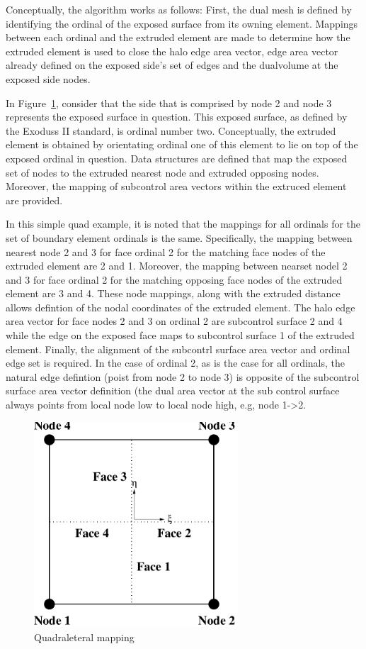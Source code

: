 Conceptually, the algorithm works as follows: First, the dual mesh is defined by identifying
the ordinal of the exposed surface from its owning element. Mappings between each ordinal and the
extruded element are made to determine how the extruded element is used to close the halo edge area vector,
edge area vector already defined on the exposed side's set of edges and the dualvolume at the exposed
side nodes.

In Figure~\ref{quad-halo}, consider that the side that is comprised by node 2 and node 3 represents 
the exposed surface in question. This exposed surface, as defined by the Exoduss II standard, is ordinal number two. 
Conceptually, the extruded element is obtained by orientating ordinal one of this element to lie on top of the exposed 
ordinal in question. Data structures are defined that map the exposed set of nodes to the extruded 
nearest node and extruded opposing nodes. Moreover, the mapping of subcontrol area vectors within 
the extruced element are provided.  

In this simple quad example, it is noted that the mappings for all
ordinals for the set of boundary element ordinals is the same. Specifically, the mapping between 
nearest node 2 and 3 for face ordinal 2 for the matching face nodes of the extruded element are 2 and 1. Moreover, the mapping 
between nearset nodel 2 and 3 for face ordinal 2 for the matching opposing face nodes of the extruded
element are 3 and 4. These node mappings, along with the extruded distance allows defintion of the nodal coordinates
of the extruded element. The halo edge area vector for face nodes 2 and 3 on ordinal 2 are subcontrol surface 2 and 4 
while the edge on the exposed face maps to subcontrol surface 1 of the extruded element. Finally, the
alignment of the subcontrl surface area vector and ordinal edge set is required. In the case of ordinal 2, as is the
case for all ordinals, the natural edge defintion (poist from node 2 to node 3) is opposite of the subcontrol
surface area vector definition (the dual area vector at the sub control surface always points from local node low to
local node high, e.g, node 1->2.

\begin{figure}[ht]
\centerline{\includegraphics[width=3.0in]{images/quadel.pdf}}
\vspace{0.1in}
\caption{Quadraleteral mapping}
\label{quad-halo}
\end{figure}

